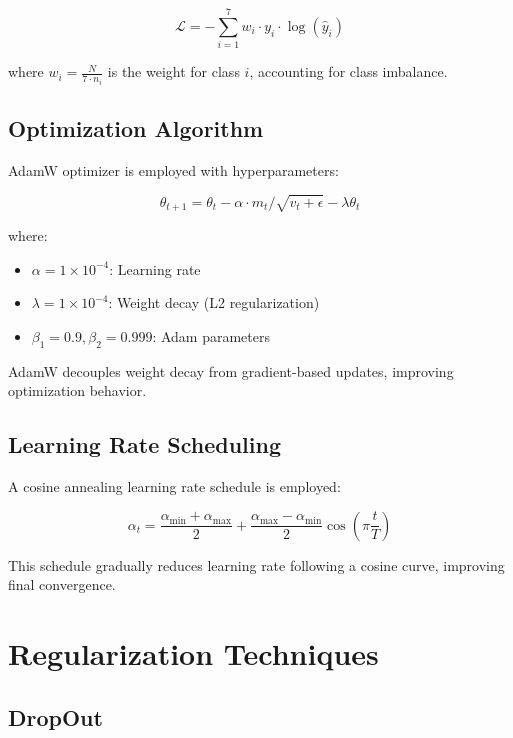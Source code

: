 \begin{equation}
\mathcal{L} = -\sum_{i=1}^{7} w_i \cdot y_i \cdot \log(\hat{y}_i)
\end{equation}

where $w_i = \frac{N}{7 \cdot n_i}$ is the weight for class $i$, accounting for class imbalance.

\subsection{Optimization Algorithm}

AdamW optimizer is employed with hyperparameters:

\begin{equation}
\theta_{t+1} = \theta_t - \alpha \cdot m_t / \sqrt{v_t + \epsilon} - \lambda \theta_t
\end{equation}

where:
\begin{itemize}
    \item $\alpha = 1 \times 10^{-4}$: Learning rate
    \item $\lambda = 1 \times 10^{-4}$: Weight decay (L2 regularization)
    \item $\beta_1 = 0.9, \beta_2 = 0.999$: Adam parameters
\end{itemize}

AdamW decouples weight decay from gradient-based updates, improving optimization behavior.

\subsection{Learning Rate Scheduling}

A cosine annealing learning rate schedule is employed:

\begin{equation}
\alpha_t = \frac{\alpha_{\min} + \alpha_{\max}}{2} + \frac{\alpha_{\max} - \alpha_{\min}}{2} \cos\left(\pi \frac{t}{T}\right)
\end{equation}

This schedule gradually reduces learning rate following a cosine curve, improving final convergence.

\section{Regularization Techniques}

\subsection{DropOut}

